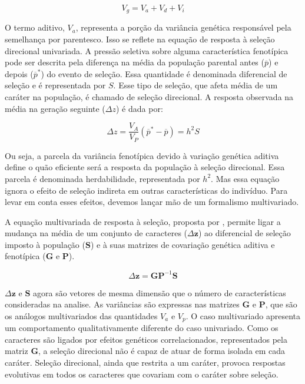 \begin{equation}
    V_g = V_a + V_d + V_{i}
    \label{compgen}
\end{equation}

O termo aditivo, $V_a$, representa a porção da variância genética
responsável pela semelhança por parentesco.
Isso se reflete na equação de resposta à seleção direcional univariada.
A pressão seletiva sobre alguma característica fenotípica pode ser descrita
pela diferença na média da população parental antes ($\overline p$) e depois
($\overline p^*$) do evento de seleção.
Essa quantidade é denominada diferencial de seleção e é representada por
$S$.
Esse tipo de seleção, que afeta média de um caráter na população, é
chamado de seleção direcional.
A resposta observada na média na geração seguinte ($\Delta z$) é dada
por:

\begin{equation}
    \Delta z = \frac{V_A}{V_P} (\overline p^* - \overline p) = h^2S
\end{equation}

Ou seja, a parcela da variância fenotípica devido à variação genética
aditiva define o quão eficiente será a resposta da população à seleção
direcional.
Essa parcela é denominada herdabilidade, representada por $h^2$.
Mas essa equação ignora o efeito de seleção indireta em outras
características do indivíduo.
Para levar em conta esses efeitos, devemos
lançar mão de um formalismo multivariado.

A equação multivariada de resposta à seleção,
proposta por \cite{Lande1979}, permite ligar a mudança na média de um
conjunto de caracteres ($\Delta \mathbf{z}$) ao diferencial de seleção imposto à população
($\mathbf{S}$) e à suas matrizes de covariação genética aditiva e fenotípica
($\mathbf{G}$ e $\mathbf{P}$).

\begin{equation}
    \Delta \mathbf{z} = \mathbf{GP}^{-1}\mathbf{S}
\end{equation}
 
$\Delta \mathbf{z}$ e $\mathbf{S}$ agora são vetores de mesma dimensão que o número
de características consideradas na analise.
As variâncias são expressas nas matrizes $\mathbf{G}$ e $\mathbf{P}$, que são os análogos
multivariados das quantidades $V_a$ e $V_p$.
O caso multivariado apresenta um comportamento qualitativamente
diferente do caso univariado.
Como os caracteres são ligados por efeitos genéticos correlacionados,
representados pela matriz $\mathbf{G}$, a seleção direcional não é capaz de atuar de
forma isolada em cada caráter.
Seleção direcional, ainda que restrita a um caráter, provoca respostas
evolutivas em todos os caracteres que covariam com o caráter sobre
seleção.

